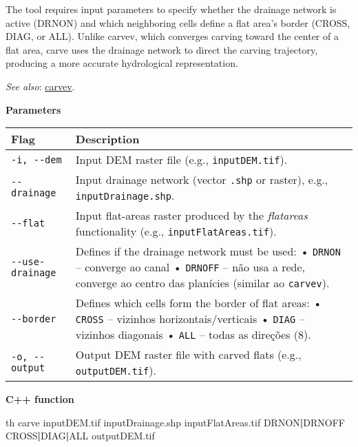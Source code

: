 \documentclass[
]{book}
\newenvironment{Shaded}{\begin{snugshade}}{\end{snugshade}}
\newcommand{\ExtensionTok}[1]{#1}
\newcommand{\KeywordTok}[1]{\textcolor[rgb]{0.13,0.29,0.53}{\textbf{#1}}}
\newcommand{\NormalTok}[1]{#1}
\theoremstyle{definition}
\theoremstyle{definition}
\theoremstyle{definition}
\theoremstyle{definition}
\theoremstyle{remark}
\begin{document}
The tool requires input parameters to specify whether the drainage network is active (DRNON) and which neighboring cells define a flat area's border (CROSS, DIAG, or ALL). Unlike carvev, which converges carving toward the center of a flat area, carve uses the drainage network to direct the carving trajectory, producing a more accurate hydrological representation.

\emph{See also}: \hyperref[carvev]{carvev}.

\textbf{Parameters}

\begin{longtable}[]{@{}
  >{\raggedright\arraybackslash}p{}
  >{\raggedright\arraybackslash}p{}@{}}
\toprule\noalign{}
\begin{minipage}[b]{\linewidth}\raggedright
Flag
\end{minipage} & \begin{minipage}[b]{\linewidth}\raggedright
Description
\end{minipage} \\
\midrule\noalign{}
\endhead
\bottomrule\noalign{}
\endlastfoot
\texttt{-i,\ -\/-dem} & Input DEM raster file (e.g., \texttt{inputDEM.tif}). \\
\texttt{-\/-drainage} & Input drainage network (vector \texttt{.shp} or raster), e.g., \texttt{inputDrainage.shp}. \\
\texttt{-\/-flat} & Input flat-areas raster produced by the \emph{flatareas} functionality (e.g., \texttt{inputFlatAreas.tif}). \\
\texttt{-\/-use-drainage} & Defines if the drainage network must be used: • \texttt{DRNON} -- converge ao canal • \texttt{DRNOFF} -- não usa a rede, converge ao centro das planícies (similar ao \texttt{carvev}). \\
\texttt{-\/-border} & Defines which cells form the border of flat areas: • \texttt{CROSS} -- vizinhos horizontais/verticais • \texttt{DIAG} -- vizinhos diagonais • \texttt{ALL} -- todas as direções (8). \\
\texttt{-o,\ -\/-output} & Output DEM raster file with carved flats (e.g., \texttt{outputDEM.tif}). \\
\end{longtable}

\textbf{C++ function}

\begin{Shaded}
\begin{Highlighting}[]
\ExtensionTok{th}\NormalTok{ carve inputDEM.tif inputDrainage.shp inputFlatAreas.tif DRNON}\KeywordTok{|}\ExtensionTok{DRNOFF}\NormalTok{ CROSS}\KeywordTok{|}\ExtensionTok{DIAG}\KeywordTok{|}\ExtensionTok{ALL}\NormalTok{ outputDEM.tif}
\end{Highlighting}
\end{Shaded}
\end{document}
